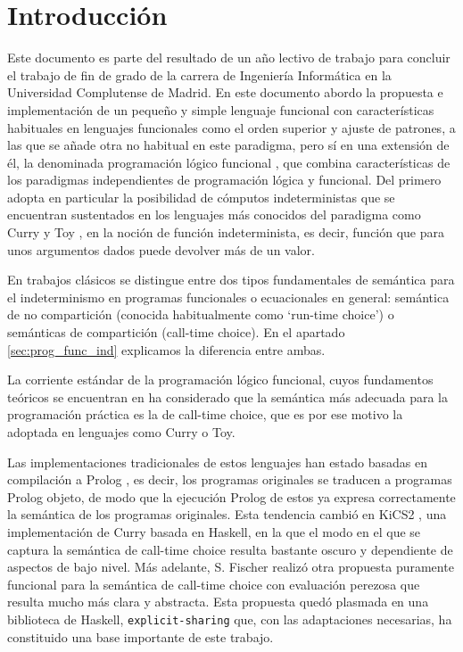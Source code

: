 \documentclass[class=article, crop=false]{standalone}
\begin{document}
\section{Introducción}
Este documento es parte del resultado de un año lectivo de trabajo para concluir el trabajo
de fin de grado de la carrera de Ingeniería Informática en la Universidad Complutense de
Madrid. En este documento abordo la propuesta e implementación de un pequeño y simple
lenguaje funcional con características habituales en lenguajes funcionales como el orden
superior y ajuste de patrones, a las que se añade otra no habitual en este paradigma, pero sí
en una extensión de él, la denominada programación lógico
funcional \cite{antoy2010functional}, que combina características de los paradigmas
independientes de programación lógica y funcional. Del primero adopta en particular la
posibilidad de cómputos indeterministas que se encuentran sustentados en los lenguajes más
conocidos del paradigma como Curry \cite{Hanus16Curry} y Toy \cite{fraguas1999toy}, en la
noción de función indeterminista, es decir, función que para unos argumentos dados puede
devolver más de un valor.

En trabajos clásicos \cite{hussmann1993nondeterminism} se distingue entre dos tipos
fundamentales de  semántica para el indeterminismo en programas funcionales o ecuacionales en
general: semántica de no compartición (conocida habitualmente como `run-time choice') o
semánticas de compartición (call-time choice). En el apartado \ref{sec:prog_func_ind}
explicamos la diferencia entre ambas.

La corriente estándar de la programación lógico funcional, cuyos fundamentos teóricos se
encuentran en \cite{DBLP:journals/jlp/Gonzalez-MorenoHLR99} ha considerado que la semántica
más adecuada para la programación práctica es la de call-time choice, que es por ese motivo
la adoptada en lenguajes como Curry o Toy.

Las implementaciones tradicionales de estos lenguajes han estado basadas en compilación a
Prolog \cite{deransart2012prolog}, es decir, los programas originales se traducen a programas
Prolog objeto, de modo que la ejecución Prolog de estos ya expresa correctamente la semántica
de los programas originales. Esta tendencia cambió en KiCS2
\cite{BrasselHanusPeemoellerReck11}, una implementación de Curry basada en Haskell, en la que
el modo en el que se captura la semántica de call-time choice resulta bastante oscuro y
dependiente de aspectos de bajo nivel. Más adelante, S. Fischer realizó otra propuesta
puramente funcional para la semántica de call-time choice con evaluación
perezosa \cite{fischer2011purely} que resulta mucho más clara y abstracta. Esta propuesta
quedó plasmada en una biblioteca de Haskell, \verb`explicit-sharing` que, con las
adaptaciones necesarias, ha constituido una base importante de este trabajo.
\end{document}

